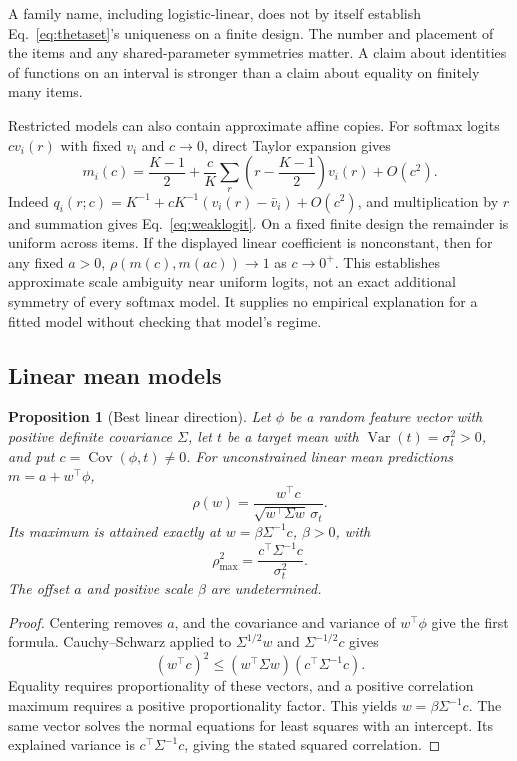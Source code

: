\documentclass[11pt,letterpaper]{article}
\newtheorem{proposition}{Proposition}
\newcommand{\Var}{\operatorname{Var}}
\newcommand{\Cov}{\operatorname{Cov}}
\begin{document}
A family name, including logistic-linear, does not by itself establish Eq.~\eqref{eq:thetaset}'s uniqueness on a finite design.
The number and placement of the items and any shared-parameter symmetries matter.
A claim about identities of functions on an interval is stronger than a claim about equality on finitely many items.

Restricted models can also contain approximate affine copies.
For softmax logits $c v_i(r)$ with fixed $v_i$ and $c\to0$, direct Taylor expansion gives
\begin{equation}\label{eq:weaklogit}
 m_i(c)=\frac{K-1}{2}+\frac cK\sum_r\left(r-\frac{K-1}{2}\right)v_i(r)+O(c^2).
\end{equation}
Indeed $q_i(r;c)=K^{-1}+cK^{-1}(v_i(r)-\bar v_i)+O(c^2)$, and multiplication by $r$ and summation gives Eq.~\eqref{eq:weaklogit}.
On a fixed finite design the remainder is uniform across items.
If the displayed linear coefficient is nonconstant, then for any fixed $a>0$, $\rho(m(c),m(ac))\to1$ as $c\to0^+$.
This establishes approximate scale ambiguity near uniform logits, not an exact additional symmetry of every softmax model.
It supplies no empirical explanation for a fitted model without checking that model's regime.

\subsection{Linear mean models}
\begin{proposition}[Best linear direction]\label{prop:linear}
Let $\phi$ be a random feature vector with positive definite covariance $\Sigma$, let $t$ be a target mean with $\Var(t)=\sigma_t^2>0$, and put $c=\Cov(\phi,t)\ne0$.
For unconstrained linear mean predictions $m=a+w^\top\phi$,
\[
 \rho(w)=\frac{w^\top c}{\sqrt{w^\top\Sigma w}\,\sigma_t}.
\]
Its maximum is attained exactly at $w=\beta\Sigma^{-1}c$, $\beta>0$, with
\[
 \rho_{\max}^2=\frac{c^\top\Sigma^{-1}c}{\sigma_t^2}.
\]
The offset $a$ and positive scale $\beta$ are undetermined.
\end{proposition}
\begin{proof}
Centering removes $a$, and the covariance and variance of $w^\top\phi$ give the first formula.
Cauchy--Schwarz applied to $\Sigma^{1/2}w$ and $\Sigma^{-1/2}c$ gives
\[
 (w^\top c)^2\le(w^\top\Sigma w)(c^\top\Sigma^{-1}c).
\]
Equality requires proportionality of these vectors, and a positive correlation maximum requires a positive proportionality factor.
This yields $w=\beta\Sigma^{-1}c$.
The same vector solves the normal equations for least squares with an intercept.
Its explained variance is $c^\top\Sigma^{-1}c$, giving the stated squared correlation.
\end{proof}
\end{document}
